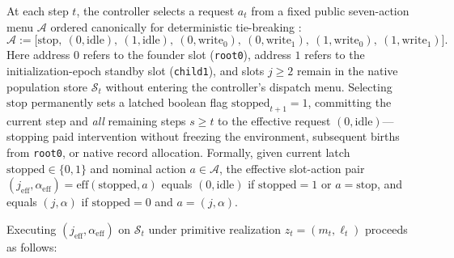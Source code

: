 \documentclass[11pt,a4paper]{article}
\begin{document}
At each step \(t\), the controller selects a request \(a_t\) from a
fixed public seven-action menu \(\mathcal{A}\) ordered canonically for
deterministic tie-breaking \citep{derman1970, puterman1994}:
\[\mathcal{A} := \bigl[\mathrm{stop},\ (0, \mathrm{idle}),\ (1, \mathrm{idle}),\ (0, \mathrm{write}_0),\ (0, \mathrm{write}_1),\ (1, \mathrm{write}_0),\ (1, \mathrm{write}_1)\bigr].\]
Here address \(0\) refers to the founder slot (\texttt{root0}), address
\(1\) refers to the initialization-epoch standby slot (\texttt{child1}),
and slots \(j \ge 2\) remain in the native population store
\(\mathcal{S}_t\) without entering the controller's dispatch menu.
Selecting \(\mathrm{stop}\) permanently sets a latched boolean flag
\(\mathrm{stopped}_{t+1} = 1\), committing the current step and
\emph{all} remaining steps \(s \ge t\) to the effective request
\((0, \mathrm{idle})\)---stopping paid intervention without freezing the
environment, subsequent births from \texttt{root0}, or native record
allocation. Formally, given current latch
\(\mathrm{stopped} \in \{0,1\}\) and nominal action
\(a \in \mathcal{A}\), the effective slot-action pair
\((j_{\mathrm{eff}}, \alpha_{\mathrm{eff}}) = \mathrm{eff}(\mathrm{stopped}, a)\)
equals \((0, \mathrm{idle})\) if \(\mathrm{stopped} = 1\) or
\(a = \mathrm{stop}\), and equals \((j, \alpha)\) if
\(\mathrm{stopped} = 0\) and \(a = (j, \alpha)\).

Executing \((j_{\mathrm{eff}}, \alpha_{\mathrm{eff}})\) on
\(\mathcal{S}_t\) under primitive realization \(z_t = (m_t, \ell_t)\)
proceeds as follows:
\end{document}
